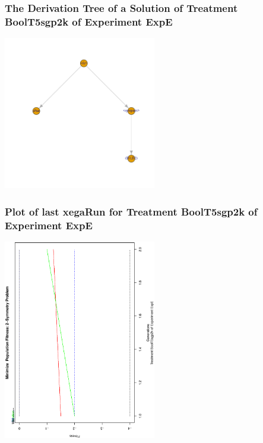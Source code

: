 \documentclass[18pt,c]{beamer}
\begin{document}
 \begin{frame}
 \frametitle{ The Derivation Tree of a Solution of Treatment BoolT5sgp2k of Experiment ExpE }
 \begin{center}
\includegraphics[width=0.5\textwidth, angle=0]
{ExpEDerivationTreeFigure005.pdf}
 \end{center}
 \label{report/ExpEDerivationTreeFigure005.pdf}  
 \end{frame}

 \begin{frame}
 \frametitle{ Plot of last xegaRun for Treatment BoolT5sgp2k of Experiment ExpE }
 \begin{center}
\includegraphics[width=0.5\textwidth, angle=-90]
{ExpEPlotPopStatsFigure005.eps}
 \end{center}
 \label{report/ExpEPlotPopStatsFigure005.eps}  
 \end{frame}
\end{document}
